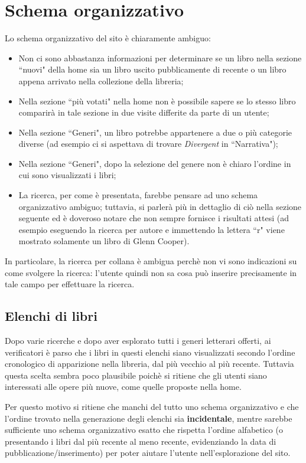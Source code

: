 \section{Schema organizzativo}\label{sec:schema-org}
Lo schema organizzativo del sito è chiaramente ambiguo:
\begin{itemize}
\item Non ci sono abbastanza informazioni per determinare se un libro nella
sezione ``nuovi" della home sia un libro uscito pubblicamente di recente o un
libro appena arrivato nella collezione della libreria;
\item Nella sezione ``più votati" nella home non è possibile sapere se
lo stesso libro comparirà in tale sezione in due visite differite da parte di
un utente;
\item Nella sezione ``Generi", un libro potrebbe appartenere a due o più
categorie diverse (ad esempio ci si aspettava di trovare \textit{Divergent} in
``Narrativa");
\item Nella sezione ``Generi", dopo la selezione del genere non è chiaro
l'ordine in cui sono visualizzati i libri;
\item La ricerca, per come è presentata, farebbe pensare ad uno schema
organizzativo ambiguo; tuttavia, si parlerà più in dettaglio di ciò nella
sezione seguente ed è doveroso notare che non sempre fornisce i risultati
attesi (ad esempio eseguendo la ricerca per autore e immettendo la lettera ``r"
viene mostrato solamente un libro di Glenn Cooper).
\end{itemize}

In particolare, la ricerca per collana è ambigua perchè non vi sono
indicazioni su come svolgere la ricerca: l'utente quindi non sa cosa può
inserire precisamente in tale campo per effettuare la ricerca.

\subsection{Elenchi di libri}\label{sec:schema-elenchi}
Dopo varie ricerche e dopo aver esplorato tutti i generi letterari offerti, ai
verificatori è parso che i libri in questi elenchi siano visualizzati secondo
l'ordine cronologico di apparizione nella libreria, dal più vecchio al
più recente. Tuttavia questa scelta sembra poco plausibile poichè si ritiene
che gli utenti siano interessati alle opere più nuove, come quelle proposte
nella home.

Per questo motivo si ritiene che manchi del tutto uno schema organizzativo e
che l'ordine trovato nella generazione degli elenchi sia \textbf{incidentale},
mentre sarebbe sufficiente uno schema organizzativo esatto che rispetta
l'ordine alfabetico (o presentando i libri dal più recente al meno recente,
evidenziando la data di pubblicazione/inserimento) per poter aiutare l'utente
nell'esplorazione del sito.